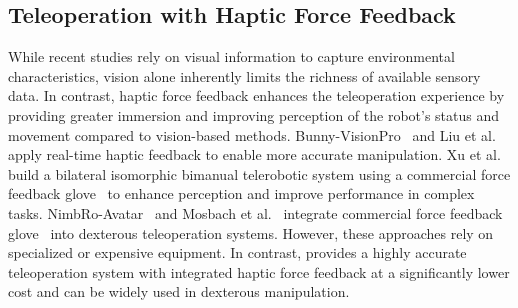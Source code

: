 \subsection{Teleoperation with Haptic Force Feedback}
While recent studies rely on visual information to capture environmental characteristics, vision alone inherently limits the richness of available sensory data. 
In contrast, haptic force feedback enhances the teleoperation experience by providing greater immersion and improving perception of the robot's status and movement compared to vision-based methods. 
Bunny-VisionPro~\cite{ding2024bunny} and Liu et al.~\cite{liu2019high} apply real-time haptic feedback to enable more accurate manipulation. 
Xu et al.~\cite{xu2025immersive} build a bilateral isomorphic bimanual telerobotic system using a commercial force feedback glove~\cite{dextarobotics} to enhance perception and improve performance in complex tasks.
NimbRo-Avatar~\cite{schwarz2021nimbro} and Mosbach et al.~\cite{mosbach2022accelerating} integrate commercial force feedback glove~\cite{senseglove} into dexterous teleoperation systems.
However, these approaches rely on specialized or expensive equipment. In contrast, \oursystem provides a highly accurate teleoperation system with integrated haptic force feedback at a significantly lower cost and can be widely used in dexterous manipulation.
